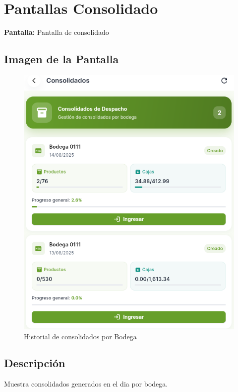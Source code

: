 \documentclass[12pt,a4paper]{report}
\begin{document}
\section{Pantallas Consolidado}

\begin{pantallabox}
\textbf{Pantalla:} Pantalla de consolidado \\
\end{pantallabox}

\subsection{Imagen de la Pantalla}
\begin{figure}[H]
    \centering
    \includegraphics[width=\textwidth]{pantallas/consoldiados.png}
    \caption{Historial de consolidados por Bodega}
    \label{fig:consolidado_detalle}
\end{figure}

\subsection{Descripción}
Muestra consolidados generados en el dia por bodega.
\end{document}
